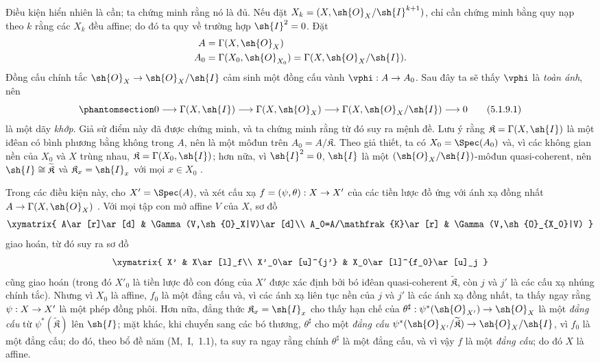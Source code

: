 \documentclass[oneside]{amsart}
\makeatletter
\newcommand{\ega@arrow}[2]{\mathchoice{#1}{#2}{#2}{#2}}
\renewcommand{\to}{\ega@arrow{\longrightarrow}{\rightarrow}}
\let\EGAOriginalLabel\label
\renewcommand{\label}[1]{\phantomsection\EGAOriginalLabel{#1}}
\makeatother
\begin{document}
Điều kiện hiển nhiên là cần; ta chứng minh rằng nó là đủ.
Nếu đặt $X_k=(X,\sh{O}_X/\sh{I}^{k+1})$, chỉ cần chứng minh bằng quy nạp theo $k$ rằng các $X_k$ đều affine; do đó ta quy về trường hợp $\sh{I}^2=0$.
Đặt
\begin{align*}
  A&=\Gamma(X,\sh{O}_X)\\
  A_0&=\Gamma(X_0,\sh{O}_{X_0})=\Gamma(X,\sh{O}_X/\sh{I}).
\end{align*}
Đồng cấu chính tắc $\sh{O}_X\to\sh{O}_X/\sh{I}$ cảm sinh một đồng cấu vành $\vphi:A\to A_0$.
Sau đây ta sẽ thấy $\vphi$ là \emph{toàn ánh}, nên
\[
\label{I.5.1.9.1}
  0\to\Gamma(X,\sh{I})\to\Gamma(X,\sh{O}_X)\to\Gamma(X,\sh{O}_X/\sh{I})\to 0\tag{5.1.9.1}
\]
là một dãy \emph{khớp}.
Giả sử điểm này đã được chứng minh, và ta chứng minh rằng từ đó suy ra mệnh đề.
Lưu ý rằng $\mathfrak{K}=\Gamma(X,\sh{I})$ là một iđêan có bình phương bằng không trong $A$, nên là một môđun trên $A_0=A/\mathfrak{K}$.
Theo giả thiết, ta có $X_0=\Spec(A_0)$ và, vì các không gian nền của $X_0$ và $X$ trùng nhau, $\mathfrak{K}=\Gamma(X_0,\sh{I})$;
hơn nữa, vì $\sh{I}^2=0$, $\sh{I}$ là một $(\sh{O}_X/\sh{I})$-môđun quasi-coherent, nên $\sh{I}\cong\widetilde{\mathfrak{K}}$ và $\mathfrak{K}_x=\sh{I}_x$ với mọi $x\in X_0$ .

Trong các điều kiện này, cho $X'=\Spec(A)$, và xét cấu xạ $f=(\psi,\theta):X\to X'$ của các tiền lược đồ ứng với ánh xạ đồng nhất $A\to\Gamma(X,\sh{O}_X)$ .
Với mọi tập con mở affine $V$ của $X$, sơ đồ
\[
  \xymatrix{
    A\ar[r]\ar[d] &
    \Gamma(V,\sh{O}_X|V)\ar[d]\\
    A_0=A/\mathfrak{K}\ar[r] &
    \Gamma(V,\sh{O}_{X_0}|V)
  }
\]
giao hoán, từ đó suy ra sơ đồ
\[
  \xymatrix{
    X' &
    X\ar[l]_f\\
    X'_0\ar[u]^{j'} &
    X_0\ar[l]^{f_0}\ar[u]_j
  }
\]
cũng giao hoán (trong đó $X'_0$ là tiền lược đồ con đóng của $X'$ được xác định bởi bó iđêan quasi-coherent $\widetilde{\mathfrak{K}}$, còn $j$ và $j'$ là các cấu xạ nhúng chính tắc).
Nhưng vì $X_0$ là affine, $f_0$ là một đẳng cấu và, vì các ánh xạ liên tục nền của $j$ và $j'$ là các ánh xạ đồng nhất, ta thấy ngay rằng $\psi:X\to X'$ là một phép đồng phôi.
Hơn nữa, đẳng thức $\mathfrak{K}_x=\sh{I}_x$ cho thấy hạn chế của $\theta^\sharp:\psi^*(\sh{O}_{X'})\to\sh{O}_X$ là một \emph{đẳng cấu} từ $\psi^*(\widetilde{\mathfrak{K}})$ lên $\sh{I}$;
mặt khác, khi chuyển sang các bó thương, $\theta^\sharp$ cho một \emph{đẳng cấu} $\psi^*(\sh{O}_{X'}/\widetilde{\mathfrak{K}})\to\sh{O}_X/\sh{I}$, vì $f_0$ là một đẳng cấu;
do đó, theo bổ đề năm (M,~I,~1.1), ta suy ra ngay rằng chính $\theta^\sharp$ là một đẳng cấu, và vì vậy $f$ là một \emph{đẳng cấu}; do đó $X$ là affine.
\end{document}
